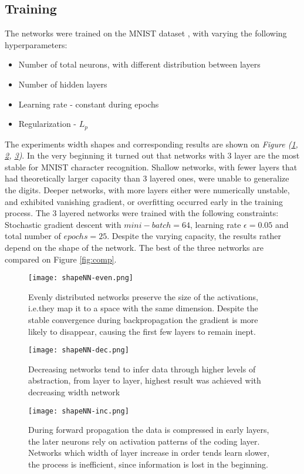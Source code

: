\subsection{Training}
\label{train}
The networks were trained on the MNIST dataset \cite{mnist}, with varying the following hyperparameters:
\begin{itemize}
    \item Number of total neurons, with different distribution between layers
    \item Number of hidden layers
    \item Learning rate - constant during epochs
    \item Regularization - $L_p$
\end{itemize}

The experiments width shapes and corresponding results are shown on \emph{Figure (\ref{fig:even}, \ref{fig:dec}, \ref{fig:inc})}.
In the very beginning it turned out that networks with 3 layer are the most stable for MNIST character recognition. 
Shallow networks, with fewer layers that had theoretically larger capacity than 3 layered ones, were unable to generalize the digits.
Deeper networks, with more layers either were numerically unstable, and exhibited vanishing gradient, or overfitting occurred early in the training process.
The 3 layered networks were trained with the following constraints: Stochastic gradient descent with $mini-batch=64$, learning rate $\epsilon = 0.05$ and total number of $epochs=25$.
Despite the varying capacity, the results rather depend on the shape of the network. The best of the three networks are compared on Figure \ref{fig:comp}.


\begin{figure}
    \centering
    \texttt{[image: shapeNN-even.png]}
    \caption{Evenly distributed networks preserve the size of the    
    activations,    
    i.e.they map it to a space with the same dimension. 
    Despite the stable convergence during backpropagation the gradient is more likely to disappear, causing the first few layers to remain inept.}
    \label{fig:even}
\end{figure}
\begin{figure}
    \centering
    \texttt{[image: shapeNN-dec.png]}
    \caption{Decreasing networks tend to infer data through 
    higher levels of abstraction, from layer to layer, highest result was 
    achieved with decreasing width network}
    \label{fig:dec}
\end{figure}
\begin{figure}
    \centering
    \texttt{[image: shapeNN-inc.png]}
    \caption{During forward propagation the data is compressed in early layers, the later neurons rely on activation patterns of the coding layer. Networks which width of layer increase in order tends learn slower, the process is inefficient, since information is lost in the beginning.}
    \label{fig:inc}
\end{figure}


